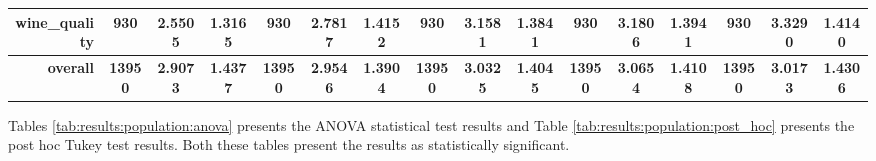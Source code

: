\begin{table}[htbp]
{\begin{tabular}{rccccccccccccccc}
			wine\_quality                       & 930                                     & \cellcolor[rgb]{ .776,  .937,  .808}\textcolor[rgb]{ 0,  .38,  0}{2.5505}          & 1.3165          & 930                             & 2.7817                                                                    & 1.4152          & 930                             & 3.1581          & 1.3841          & 930                             & 3.1806                                                                    & 1.3941          & 930                             & 3.3290                                                                    & 1.4140          \\
			\midrule
			\textbf{overall}                    & \textbf{13950}                          & \cellcolor[rgb]{ .776,  .937,  .808}\textcolor[rgb]{ 0,  .38,  0}{\textbf{2.9073}} & \textbf{1.4377} & \textbf{13950}                  & \textbf{2.9546}                                                           & \textbf{1.3904} & \textbf{13950}                  & \textbf{3.0325} & \textbf{1.4045} & \textbf{13950}                  & \textbf{3.0654}                                                           & \textbf{1.4108} & \textbf{13950}                  & \textbf{3.0173}                                                           & \textbf{1.4306} \\
		\end{tabular}%
	}
\end{table}%

Tables \ref{tab:results:population:anova} presents the ANOVA statistical test results and Table \ref{tab:results:population:post_hoc} presents the post hoc Tukey test results. Both these tables present the results as statistically significant.


\begin{table}[htbp]
	\centering
	\caption{ANOVA - Rank - BHH Variant: Population}
	\label{tab:results:population:anova}%
	\par\bigskip

\end{table}


